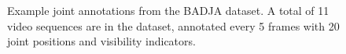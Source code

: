 \begin{figure}[t]
\def\bb{\rule{2in}{0pt}\rule{0pt}{1in}}
\begin{center}
\end{center}
\caption{Example joint annotations from the BADJA dataset.  A total of 11 video sequences are in the dataset, annotated every 5 frames with 20 joint positions and visibility indicators.
}
\label{fig:badja_examples}
\end{figure}


